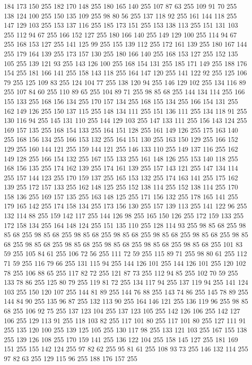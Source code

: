 184 173 150 255 182 170 148 255 180 165 140 255 107 87 63 255 109 91 70 255 138 124 100 255 150 135 109 255 98 80 56 255 137 118 92 255 161 144 118 255 147 129 103 255 153 137 116 255 185 173 151 255 153 138 113 255 151 131 103 255 112 94 67 255 166 152 127 255 180 166 140 255 149 129 100 255 114 94 67 255 168 153 127 255 141 125 99 255 155 139 112 255 172 161 139 255 180 167 144 255 179 164 139 255 173 157 130 255 180 166 140 255 168 153 127 255 152 135 105 255 139 121 93 255 143 126 100 255 168 154 131 255 185 171 149 255 188 176 154 255 181 166 141 255 158 143 118 255 164 147 120 255 141 122 92 255 125 106 79 255 125 109 83 255 124 104 77 255 138 120 94 255 146 129 102 255 134 116 89 255 107 84 60 255 110 89 65 255 104 89 71 255 98 85 68 255 144 134 114 255 166 155 133 255 168 156 134 255 170 157 134 255 168 155 134 255 166 154 131 255 162 149 126 255 150 137 115 255 148 134 111 255 151 136 111 255 134 118 91 255 130 116 94 255 145 131 110 255 144 129 103 255 147 133 111 255
156 143 124 255 169 157 135 255 168 154 133 255 164 151 128 255 161 149 126 255 175 163 140 255 168 156 134 255 166 153 132 255 164 151 130 255 163 150 129 255 166 152 129 255 160 144 121 255 159 144 121 255 146 133 110 255 149 137 116 255 162 149 128 255 166 154 132 255 167 155 133 255 161 148 126 255 153 140 118 255 168 156 135 255 174 162 139 255 174 161 139 255 157 143 121 255 147 134 114 255 157 144 123 255 170 159 137 255 165 153 132 255 174 163 141 255 175 162 139 255 172 157 133 255 162 148 125 255 152 138 114 255 152 138 114 255 170 158 136 255 169 157 135 255 163 148 125 255 171 156 132 255 178 165 141 255 179 165 142 255 174 158 134 255 173 156 130 255 157 139 113 255 141 122 96 255 132 114 88 255 159 142 117 255 144 126 98 255 165 150 126 255 172 159 133 255 172 158 134 255 164 148 124 255 151 135 110 255 128 114 93 255 98 85 68 255 98 85 68 255 98 85 68 255 98 85 68 255 98 85 68 255 98 85 68 255 98 85 68 255 98 85 68 255 98 85 68 255 98 85 68 255 98 85 68 255
98 85 68 255 98 85 68 255 101 83 59 255 105 84 61 255 106 72 56 255 111 72 59 255 115 89 71 255 98 80 61 255 112 71 59 255 116 79 66 255 131 115 94 255 144 126 101 255 144 126 101 255 120 102 78 255 106 88 65 255 117 82 72 255 121 87 73 255 112 94 85 255 102 70 59 255 133 78 86 255 125 80 79 255 119 81 72 255 134 117 94 255 137 119 94 255 141 124 103 255 150 120 107 255 144 81 89 255 144 76 88 255 143 74 86 255 145 78 89 255 144 84 90 255 135 96 87 255 132 113 90 255 164 146 121 255 136 119 96 255 98 85 68 255 106 92 75 255 137 123 104 255 137 123 105 255 142 126 106 255 142 127 106 255 129 113 91 255 118 103 82 255 117 101 80 255 117 101 80 255 127 111 91 255 135 120 100 255 139 125 105 255 130 117 98 255 133 121 103 255 167 155 138 255 139 126 108 255 170 159 141 255 136 122 104 255 158 145 127 255 181 169 151 255 155 142 124 255 97 82 62 255 95 81 61 255 108 93 73 255 146 132 114 255 97 82 63 255 129 115 96 255 188 176 157 255
